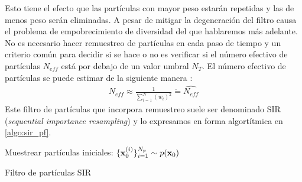 Esto tiene el efecto que las partículas con mayor peso estarán repetidas y las de menos peso serán eliminadas. A pesar de mitigar la degeneración del filtro causa el problema de empobrecimiento de diversidad del que hablaremos más adelante. No es necesario hacer remuestreo de partículas en cada paso de tiempo y un criterio común para decidir si se hace o no es verificar si el número efectivo de partículas $N_{eff}$ está por debajo de un valor umbral $N_T$. El número efectivo de partículas se puede estimar de la siguiente manera \cite{Arulampalam2002}:
\begin{align*}
    N_{eff} \approx \frac{1}{\sum_{i=1}^N (w_i)^2} \dot{=} \widehat{N_{eff}}
\end{align*}
Este filtro de partículas que incorpora remuestreo suele ser denominado SIR (\textit{sequential importance resampling}) y lo expresamos en forma algortítmica en \ref{algo:sir_pf}.


\begin{algorithm}[H]\label{algo:sir_pf}    
    Muestrear partículas iniciales: $\{\mathbf{x}_0^{(i)}\}_{i=1}^{N_p} \sim p(\mathbf{x}_0)$
    
\caption{Filtro de partículas SIR}
\end{algorithm}

